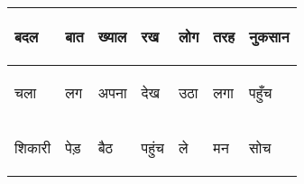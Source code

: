 \documentclass{article}
\begin{document}
\begin{table}[h]
\begin{tabular}{|l|l|l|l|l|l|l|}
\begin{hindi} बदल \end{hindi} & \begin{hindi} बात \end{hindi} & \begin{hindi} ख्याल \end{hindi} & \begin{hindi} रख \end{hindi} & \begin{hindi} लोग \end{hindi} & \begin{hindi} तरह \end{hindi} & \begin{hindi} नुकसान \end{hindi} \\ \hline 
\begin{hindi} चला \end{hindi} & \begin{hindi} लग \end{hindi} & \begin{hindi} अपना \end{hindi} & \begin{hindi} देख \end{hindi} & \begin{hindi} उठा \end{hindi} & \begin{hindi} लगा \end{hindi} & \begin{hindi} पहुँच \end{hindi} \\ \hline 
\begin{hindi} शिकारी \end{hindi} & \begin{hindi} पेड़ \end{hindi} & \begin{hindi} बैठ \end{hindi} & \begin{hindi} पहुंच \end{hindi} & \begin{hindi} ले \end{hindi} & \begin{hindi} मन \end{hindi} & \begin{hindi} सोच \end{hindi} \\ \hline 

\end{tabular}
\end{table}
\end{document}
